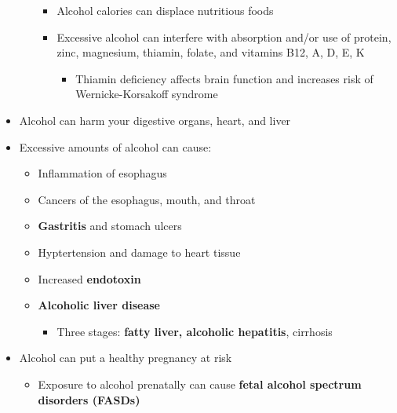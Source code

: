 \documentclass[12pt]{article}
\begin{document}
\begin{itemize}
\begin{itemize}
\begin{itemize}
\begin{itemize}
                                    \end{itemize}
                                \item Alcohol calories can displace nutritious foods
                                \item Excessive alcohol can interfere with absorption and/or use of protein, zinc, magnesium, thiamin, folate, and vitamins B12, A, D, E, K
                                    \begin{itemize}
                                        \item Thiamin deficiency affects brain function and increases risk of Wernicke-Korsakoff syndrome
                                    \end{itemize}
                            \end{itemize}
                    \end{itemize}
                \item Alcohol can harm your digestive organs, heart, and liver
                \item Excessive amounts of alcohol can cause:
                    \begin{itemize}
                        \item Inflammation of esophagus
                        \item Cancers of the esophagus, mouth, and throat
                        \item \textbf{Gastritis} and stomach ulcers
                        \item Hyptertension and damage to heart tissue
                        \item Increased \textbf{endotoxin}
                        \item \textbf{Alcoholic liver disease}
                            \begin{itemize}
                                \item Three stages: \textbf{fatty liver, alcoholic hepatitis}, cirrhosis
                            \end{itemize}
                    \end{itemize}
                \item Alcohol can put a healthy pregnancy at risk
                    \begin{itemize}
                        \item Exposure to alcohol prenatally can cause \textbf{fetal alcohol spectrum disorders (FASDs)}
                            \begin{itemize}

\end{itemize}
\end{itemize}
\end{itemize}
\end{document}
